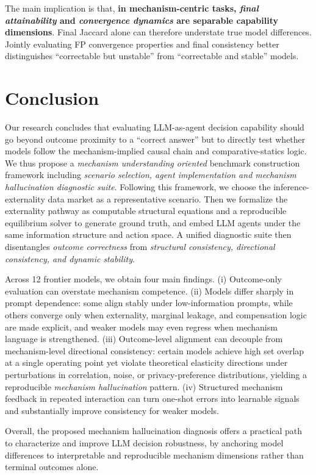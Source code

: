\documentclass[sigconf,anonymous,review]{acmart}
\theoremstyle{definition}
\begin{document}
The main implication is that, \textbf{in mechanism-centric tasks, \emph{final attainability} and \emph{convergence dynamics} are separable capability dimensions}. Final Jaccard alone can therefore understate true model differences. Jointly evaluating FP convergence properties and final consistency better distinguishes ``correctable but unstable'' from ``correctable and stable'' models.


\section{Conclusion}
\label{sec:conclusion}

Our research concludes that evaluating LLM-as-agent decision capability should go beyond outcome proximity to a ``correct answer'' but to directly test whether models follow the mechanism-implied causal chain and comparative-statics logic. We thus propose a \emph{mechanism understanding oriented} benchmark construction framework including \emph{scenario selection, agent implementation and mechanism hallucination diagnostic suite}. Following this framework, we choose the inference-externality data market as a representative scenario. Then we formalize the externality pathway as computable structural equations and a reproducible equilibrium solver to generate ground truth, and embed LLM agents under the same information structure and action space. A unified diagnostic suite then disentangles \emph{outcome correctness}  from \emph{structural consistency, directional consistency, and dynamic stability}.

Across 12 frontier models, we obtain four main findings. (i) Outcome-only evaluation can overstate mechanism competence. (ii) Models differ sharply in prompt dependence: some align stably under low-information prompts, while others converge only when externality, marginal leakage, and compensation logic are made explicit, and weaker models may even regress when mechanism language is strengthened. (iii) Outcome-level alignment can decouple from mechanism-level directional consistency: certain models achieve high set overlap at a single operating point yet violate theoretical elasticity directions under perturbations in correlation, noise, or privacy-preference distributions, yielding a reproducible \emph{mechanism hallucination} pattern. (iv) Structured mechanism feedback in repeated interaction can turn one-shot errors into learnable signals and substantially improve consistency for weaker models.

Overall, the proposed mechanism hallucination diagnosis offers a practical path to characterize and improve LLM decision robustness, by anchoring model differences to interpretable and reproducible mechanism dimensions rather than terminal outcomes alone.




\clearpage

\end{document}
